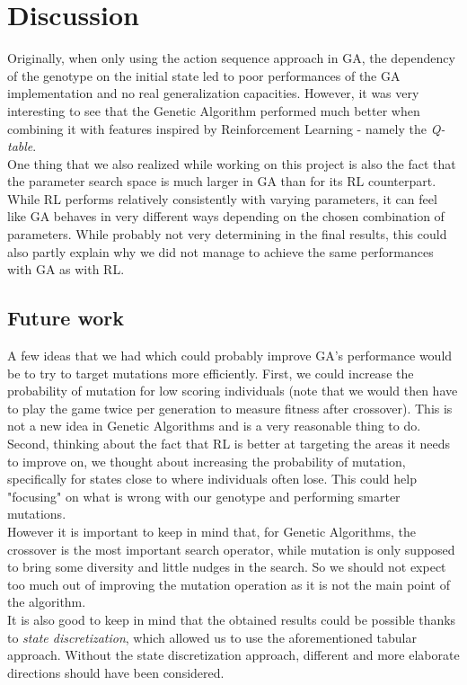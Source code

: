 \section{Discussion}
Originally, when only using the action sequence approach in GA, the dependency of the genotype on the initial state led to poor performances of the GA implementation and no real generalization capacities.
However, it was very interesting to see that the Genetic Algorithm performed much better when combining it with features inspired by Reinforcement Learning - namely the \textit{Q-table}.
\\
One thing that we also realized while working on this project is also the fact that the parameter search space is much larger in GA than for its RL counterpart. 
While RL performs relatively consistently with varying parameters, it can feel like GA behaves in very different ways depending on the chosen combination of parameters.
While probably not very determining in the final results, this could also partly explain why we did not manage to achieve the same performances with GA as with RL.
\\

\subsection{Future work}
A few ideas that we had which could probably improve GA's performance would be to try to target mutations more efficiently.
First, we could increase the probability of mutation for low scoring individuals (note that we would then have to play the game twice per generation to measure fitness after crossover).
This is not a new idea in Genetic Algorithms and is a very reasonable thing to do.
\\
Second, thinking about the fact that RL is better at targeting the areas it needs to improve on, we thought about increasing the probability of mutation, specifically for states close to where individuals often lose.
This could help "focusing" on what is wrong with our genotype and performing smarter mutations.
\\
However it is important to keep in mind that, for Genetic Algorithms, the crossover is the most important search operator, while mutation is only supposed to bring some diversity and little nudges in the search.
So we should not expect too much out of improving the mutation operation as it is not the main point of the algorithm.
\\
It is also good to keep in mind that the obtained results could be possible thanks to \textit{state discretization}, which allowed us to use the aforementioned tabular approach.
Without the state discretization approach, different and more elaborate directions should have been considered. 

